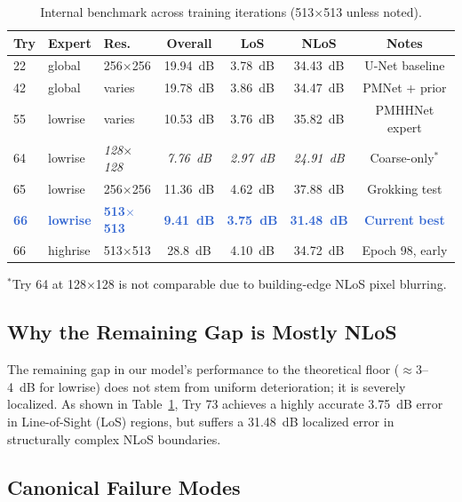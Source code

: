 \documentclass[11pt,a4paper]{article}
\newcommand{\ours}[1]{\textcolor{highlight}{\textbf{#1}}}
\begin{document}
\begin{table}[h!]
\centering
\caption{Internal benchmark across training iterations (513$\times$513 unless noted).}
\label{tab:progress}
\begin{center}
    

\begin{tabular}{lllcccc}
\toprule
\textbf{Try} & \textbf{Expert} & \textbf{Res.} & \textbf{Overall} & \textbf{LoS} & \textbf{NLoS} & \textbf{Notes} \\
\midrule
22 & global & 256$\times$256 & 19.94~dB & 3.78~dB & 34.43~dB & U-Net baseline \\
42 & global & varies & 19.78~dB & 3.86~dB & 34.47~dB & PMNet + prior \\
55 & lowrise & varies & 10.53~dB & 3.76~dB & 35.82~dB & PMHHNet expert \\
64 & lowrise & \textit{128$\times$128} & \textit{7.76~dB} & \textit{2.97~dB} & \textit{24.91~dB} & Coarse-only$^*$ \\
65 & lowrise & 256$\times$256 & 11.36~dB & 4.62~dB & 37.88~dB & Grokking test \\
\midrule
\ours{66} & \ours{lowrise} & \ours{513$\times$513} & \ours{9.41~dB} & \ours{3.75~dB} & \ours{31.48~dB} & \ours{Current best} \\
66 & highrise & 513$\times$513 & 28.8~dB & 4.10~dB & 34.72~dB & Epoch 98, early \\
\bottomrule
\end{tabular}
\end{center}
\end{table}
\footnotesize $^*$Try 64 at 128$\times$128 is not comparable due to building-edge NLoS pixel blurring.
\normalsize
\subsection{Why the Remaining Gap is Mostly NLoS}

The remaining gap in our model's performance to the theoretical floor ($\approx$3--4~dB for lowrise) does not stem from uniform deterioration; it is severely localized. As shown in Table~\ref{tab:progress}, Try 73 achieves a highly accurate 3.75~dB error in Line-of-Sight (LoS) regions, but suffers a 31.48~dB localized error in structurally complex NLoS boundaries. 

\subsection{Canonical Failure Modes}
\end{document}
